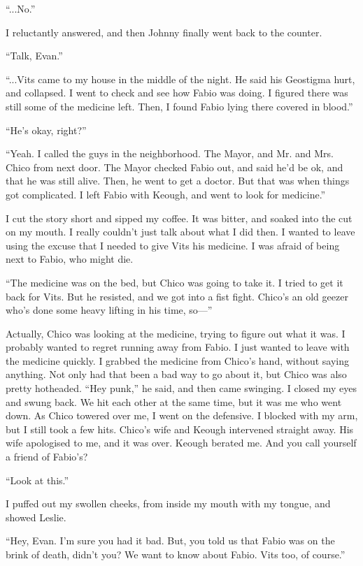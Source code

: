 \documentclass[oneside]{book}
\begin{document}
“...No.”

I reluctantly answered, and then Johnny finally went back to the counter.

“Talk, Evan.”

“...Vits came to my house in the middle of the night. He said his Geostigma hurt, and collapsed. I went to check and see how Fabio was doing. I figured there was still some of the medicine left. Then, I found Fabio lying there covered in blood.”

“He’s okay, right?”

“Yeah. I called the guys in the neighborhood. The Mayor, and Mr. and Mrs. Chico from next door. The Mayor checked Fabio out, and said he’d be ok, and that he was still alive. Then, he went to get a doctor. But that was when things got complicated. I left Fabio with Keough, and went to look for medicine.”

I cut the story short and sipped my coffee. It was bitter, and soaked into the cut on my mouth. I really couldn’t just talk about what I did then. I wanted to leave using the excuse that I needed to give Vits his medicine. I was afraid of being next to Fabio, who might die.

“The medicine was on the bed, but Chico was going to take it. I tried to get it back for Vits. But he resisted, and we got into a fist fight. Chico’s an old geezer who’s done some heavy lifting in his time, so—”

Actually, Chico was looking at the medicine, trying to figure out what it was. I probably wanted to regret running away from Fabio. I just wanted to leave with the medicine quickly. I grabbed the medicine from Chico’s hand, without saying anything. Not only had that been a bad way to go about it, but Chico was also pretty hotheaded. “Hey punk,” he said, and then came swinging. I closed my eyes and swung back. We hit each other at the same time, but it was me who went down. As Chico towered over me, I went on the defensive. I blocked with my arm, but I still took a few hits. Chico’s wife and Keough intervened straight away. His wife apologised to me, and it was over. Keough berated me. And you call yourself a friend of Fabio’s?

“Look at this.”

I puffed out my swollen cheeks, from inside my mouth with my tongue, and showed Leslie.

“Hey, Evan. I’m sure you had it bad. But, you told us that Fabio was on the brink of death, didn’t you? We want to know about Fabio. Vits too, of course.”
\end{document}
